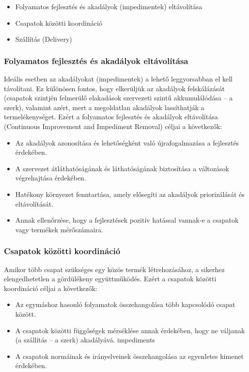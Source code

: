 \documentclass[12pt,a4paper,parskip=full]{scrartcl}
\begin{document}
\begin{itemize}
\itemsep1pt\parskip0pt
\item
 Folyamatos fejlesztés és akadályok (impedimentek) eltávolítása
\item
 Csapatok közötti koordináció
\item
 Szállítás (Delivery)
\end{itemize}

\subsubsection{Folyamatos fejlesztés és akadályok eltávolítása}\label{Continuous-improvement-and-impediment-removal}

Ideális esetben az akadályokat (impedimentek) a lehető leggyorsabban el kell távolítani. Ez különösen fontos, hogy elkerüljük az akadályok felskálázását (csapatok szintjén felmerülő elakadások szervezeti szintű akkumulálódása – a szerk), valamint azért, mert a megoldatlan akadályok lassíthatják a termelékenységet. Ezért a folyamatos fejlesztés és akadályok eltávolítása (Continuous Improvement and Impediment Removal) céljai a következők:

\begin{itemize}
\itemsep1pt\parskip0pt
\item
 Az akadályok azonosítása és lehetőségként való újrafogalmazása a fejlesztés érdekében.
\item
 A szervezet átláthatóságának és láthatóságának biztosítása a változások végrehajtása érdekében.
\item
 Hatékony környezet fenntartása, amely elősegíti az akadályok priorizálását és eltávolítását.
\item
 Annak ellenőrzése, hogy a fejlesztések pozitív hatással vannak-e a csapatok vagy termékek mérőszámaira.
\end{itemize}

\subsubsection{Csapatok közötti koordináció}\label{cross-team-coordination}
Amikor több csapat szükséges egy közös termék létrehozásához, a sikerhez elengedhetetlen a gördülékeny együttműködés. Ezért a csapatok közötti koordináció céljai a következők:

\begin{itemize}
\itemsep1pt\parskip0pt
\item
 Az egymáshoz hasonló folyamatok összehangolása több kapcsolódó csapat között.
\item
 A csapatok közötti függőségek mérséklése annak érdekében, hogy ne váljanak (a szállítás – a szerk) akadályává.
  impediments
\item
 A csapatok normáinak és irányelveinek összehangolása az egyenletes kimenet érdekében.
\end{itemize}
\end{document}
